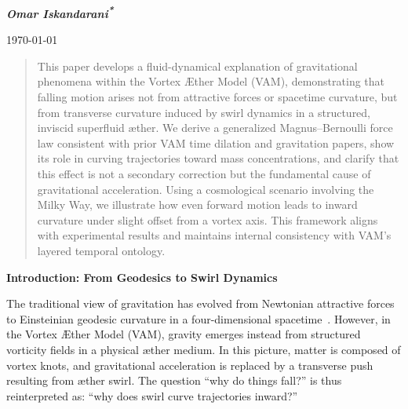 \documentclass[11pt]{article}
\begin{document}
    \begin{titlepage}
        \thispagestyle{empty}
        \centering
        \ifdefined\standalonechapter
        {\Huge\bfseries \appendixtitle \par}
        \else
            {\Huge\bfseries \papertitle \par}
        \fi
        \vspace{1cm}
        {\Large\itshape \textbf{Omar Iskandarani}\textsuperscript{\textbf{*}} \par}
        \vspace{0.5cm}
        {\today \par}
        \vspace{0.5cm}
        \begin{abstract}
            This paper develops a fluid-dynamical explanation of gravitational phenomena within the Vortex \AE ther Model (VAM), demonstrating that falling motion arises not from attractive forces or spacetime curvature, but from transverse curvature induced by swirl dynamics in a structured, inviscid superfluid \ae ther. We derive a generalized Magnus--Bernoulli force law consistent with prior VAM time dilation and gravitation papers, show its role in curving trajectories toward mass concentrations, and clarify that this effect is not a secondary correction but the fundamental cause of gravitational acceleration. Using a cosmological scenario involving the Milky Way, we illustrate how even forward motion leads to inward curvature under slight offset from a vortex axis. This framework aligns with experimental results and maintains internal consistency with VAM's layered temporal ontology.
        \end{abstract}
        \vspace{2cm}

        \raggedright %
        {\Large\bfseries Introduction: From Geodesics to Swirl Dynamics\par}
        \vspace{1em}

            \noindent The traditional view of gravitation has evolved from Newtonian attractive forces to Einsteinian geodesic curvature in a four-dimensional spacetime~\cite{einstein1916foundation}. However, in the Vortex \AE ther Model (VAM), gravity emerges instead from structured vorticity fields in a physical \ae ther medium. In this picture, matter is composed of vortex knots, and gravitational acceleration is replaced by a transverse push resulting from \ae ther swirl. The question ``why do things fall?'' is thus reinterpreted as: ``why does swirl curve trajectories inward?''


\end{titlepage}
\end{document}
